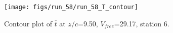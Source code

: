 \begin{figure}[H]
\centering
\texttt{[image: figs/run\_58/run\_58\_T\_contour]}
\caption{Contour plot of $\overline{t}$ at $z/c$=9.50, $V_{free}$=29.17, station 6.}
\end{figure}


